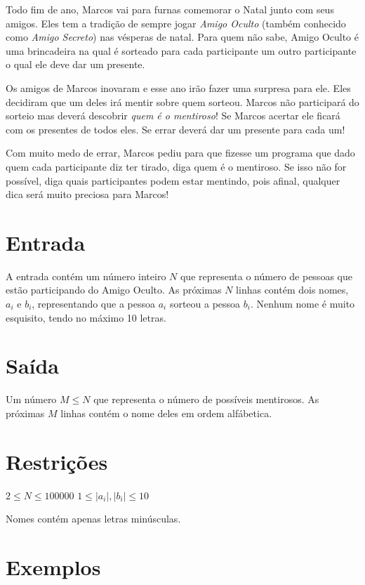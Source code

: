 Todo fim de ano, Marcos vai para furnas comemorar o Natal junto com seus amigos.
Eles tem a tradição de sempre jogar \textit{Amigo Oculto} (também conhecido como 
\textit{Amigo Secreto}) nas vésperas de natal. Para quem não sabe, Amigo Oculto
é uma brincadeira na qual é sorteado para cada participante um outro participante
o qual ele deve dar um presente. 

Os amigos de Marcos inovaram e esse ano irão fazer uma surpresa para ele. Eles decidiram
que um deles irá mentir sobre quem sorteou. Marcos não participará do sorteio mas
deverá descobrir \textit{quem é o mentiroso}! Se Marcos acertar ele ficará com os
presentes de todos eles. Se errar deverá dar um presente para cada um! 

Com muito medo de errar, Marcos pediu para que fizesse um programa que dado quem
cada participante diz ter tirado, diga quem é o mentiroso. Se isso não for possível,
diga quais participantes podem estar mentindo, pois afinal, qualquer dica será
muito preciosa para Marcos!

\section*{Entrada}

A entrada contém um número inteiro $N$ que representa o número de pessoas que estão
participando do Amigo Oculto. As próximas $N$ linhas contém dois nomes, $a_i$ e $b_i$,
representando que a pessoa $a_i$ sorteou a pessoa $b_i$.
Nenhum nome é muito esquisito, tendo no máximo 10 letras.

\section*{Saída}

Um número $M \le N$ que representa o número de possíveis mentirosos. As próximas $M$ linhas
contém o nome deles em ordem alfábetica.

\section*{Restrições}

$2 \le N \le 100000$
$1 \le |a_i|, |b_i| \le 10$

Nomes contém apenas letras minúsculas. 

\section*{Exemplos}

\exemplo
